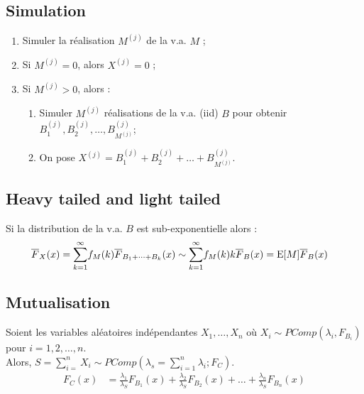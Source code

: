 \documentclass[10pt, french]{article}
\begin{document}
\begin{multicols*}{2}
\subsection{Simulation}
\begin{algo2}
\begin{enumerate}
	\item	Simuler la réalisation $M^{(j)}$ de la v.a. $M$ ;
	\item	Si $M^{(j)}	=	0$, alors $X^{(j)}	=	0$ ;
	\item	Si $M^{(j)}	>	0$, alors :	
		\begin{enumerate}
		\item	Simuler $M^{(j)}$ réalisations de la v.a. (iid) $B$ pour obtenir $B^{(j)}_{1}, B^{(j)}_{2}, \dots, B^{(j)}_{M^{(j)}}$;
		\item	On pose $X^{(j)}	=	B^{(j)}_{1} + B^{(j)}_{2} + \dots + B^{(j)}_{M^{(j)}}$.
		\end{enumerate}
\end{enumerate}
\end{algo2}

\subsection{Heavy tailed and light tailed}
Si la distribution de la v.a. $B$ est sub-exponentielle alors :
\begin{align*}
	\overline{F}_{X}(x)
	&=	\overset{\infty}{\underset{k	=	1}{\sum}}f_{M}(k) \overline{F}_{B_{1} + \dots + B_{k}}(x)
	\sim	\overset{\infty}{\underset{k	=	1}{\sum}}f_{M}(k)k\overline{F}_{B}(x)
	=	\text{E}[M]\overline{F}_{B}(x)
\end{align*}

\subsection{Mutualisation}

\begin{definitionNOHFILLsub}
Soient les variables aléatoires indépendantes $X_{1}, \dots, X_{n}$ où $X_{i} \sim PComp(\lambda_{i}, F_{B_{i}})$ pour $i	=	1, 2, \dots, n$.\\
Alors, $S	=	\sum_{i = }^{n} X_{i}	\sim	PComp(\lambda_{s} = \sum_{i = 1}^{n}\lambda_{i}; F_{C})$.
\begin{align*}
	F_{C}(x)
	&=	\frac{\lambda_{1}}{\lambda_{S}}F_{B_{1}}(x) + \frac{\lambda_{2}}{\lambda_{S}}F_{B_{2}}(x) + \dots + \frac{\lambda_{n}}{\lambda_{S}}F_{B_{n}}(x)	\\
\end{align*}
\end{definitionNOHFILLsub}



\end{multicols*}
\end{document}
